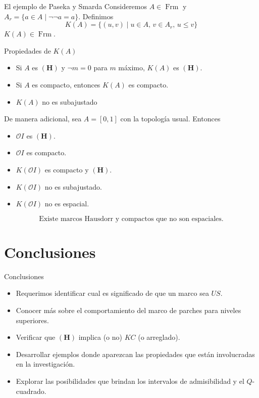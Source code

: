 \documentclass[compress,12pt]{beamer}
\DeclareMathOperator{\Frm}{Frm}
\begin{document}
\begin{frame}{El ejemplo de Paseka y Smarda}
Consideremos $A\in\Frm$ y $A_r=\{a\in A\mid \neg\neg a=a\}$. Definimos
\[
K(A)=\{(u,v)\mid u\in A,\, v\in A_r,\, u\leq v\}
\]
$K(A)\in \Frm$.
\begin{block}{Propiedades de $K(A)$}
\begin{itemize}
	\item Si $A$ es $\mathbf{(H)}$ y $\neg m=0$ para $m$ máximo, $K(A)$ es $\mathbf{(H)}$.
	\item Si $A$ es compacto, entonces $K(A)$ es compacto.
	\item $K(A)$ no es subajustado
\end{itemize}
\end{block}
\end{frame}

\begin{frame}
De manera adicional, sea $A=[0,1]$ con la topología usual. Entonces
\begin{itemize}
\item $\mathcal{O}I$ es $\mathbf{(H)}$.
\item $\mathcal{O}I$ es compacto.
\item $K(\mathcal{O}I)$ es compacto y $\mathbf{(H)}$.
\item $K(\mathcal{O}I)$ no es subajustado.
\item $K(\mathcal{O}I)$ no es espacial.
\end{itemize}

\[
\mbox{Existe marcos Hausdorr y compactos que no son espaciales}.
\]
\end{frame}

\section{Conclusiones}
\begin{frame}{Conclusiones}
\begin{itemize}
\item Requerimos identificar cual es significado de que un marco sea $US$.
\item Conocer más sobre el comportamiento del marco de parches para niveles superiores.
\item Verificar que $\mathbf{(H)}$ implica (o no) $KC$ (o arreglado).
\item Desarrollar ejemplos donde aparezcan las propiedades que están involucradas en la investigación.
\item Explorar las posibilidades que brindan los intervalos de admisibilidad y el $Q$-cuadrado.
\end{itemize}
\end{frame}
\end{document}
